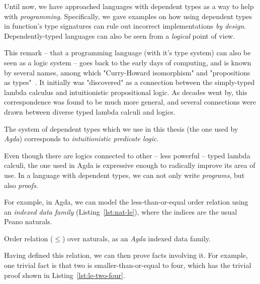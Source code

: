             Until now, we have approached languages with dependent types as a way to help with \emph{programming}.
            Specifically, we gave examples on how using dependent types in function's type signatures
            can rule out incorrect implementations \emph{by design}.
            Dependently-typed languages can also be seen from a \emph{logical} point of view.

            This remark – that a programming language (with it's type system) can also be seen
            as a logic system – goes back to the early days of computing, and is known by several names,
            among which "Curry-Howard isomorphism" and "propositions as types"~\cite{propositions-as-types}.
            It initially was "discovered" as a connection between the simply-typed lambda calculus
            and intuitionistic propositional logic.
            As decades went by, this correspondence was found to be much more general,
            and several connections were drawn between diverse typed lambda calculi and logics.

            The system of dependent types which we use in this thesis (the one used by \emph{Agda})
            corresponds to \emph{intuitionistic predicate logic}.

            Even though there are logics connected to other – less powerful – typed lambda calculi,
            the one used in Agda is expressive enough to radically improve its area of use.
            In a language with dependent types, we can not only write \emph{programs}, but also \emph{proofs}.

            For example, in Agda, we can model the less-than-or-equal order relation using an
            \emph{indexed data family} (Listing~\ref{lst:nat-le}),
            where the indices are the usual Peano naturals.

            \begin{listing}[h]
                \caption{Order relation ($\le$) over naturals, as an \emph{Agda} indexed data family.
                    \label{lst:nat-le}}
            \end{listing}

            Having defined this relation, we can then prove facts involving it.
            For example, one trivial fact is that two is smaller-than-or-equal to four,
            which has the trivial proof shown in Listing~\ref{lst:le-two-four}.

